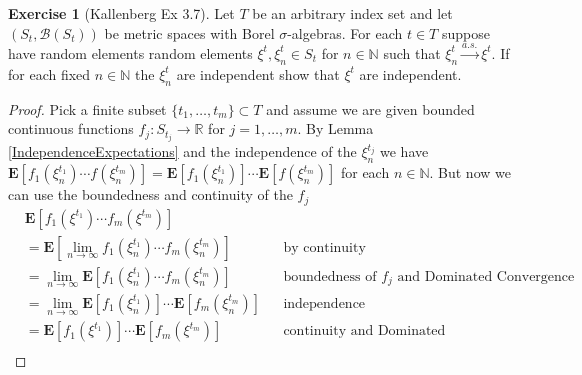 \documentclass{amsbook}
\theoremstyle{definition}
\newtheorem{xca}{Exercise}
\theoremstyle{remark}
\newcommand{\expectation}[1]{\textbf{E}\left[#1\right]}
\newcommand{\reals}{\mathbb{R}}
\newcommand{\naturals}{\mathbb{N}}
\newcommand{\toas}{\overset{a.s.}\to}
\begin{document}
\begin{xca}[Kallenberg Ex 3.7]Let $T$ be an arbitrary index set and let
  $(S_t, \mathcal{B}(S_t))$ be metric spaces with Borel
  $\sigma$-algebras.  For each $t\in T$ suppose have random elements
  random elements $\xi^t, \xi^t_n \in S_t$  for $n \in \naturals$ such
  that $\xi^t_n \toas \xi^t$.  If for each fixed $n \in \naturals$ the
  $\xi^t_n$ are independent show that $\xi^t$ are independent.
\end{xca}
\begin{proof}
Pick a finite subset $\lbrace t_1, \dotsc, t_m \rbrace \subset T$ and
assume we are given bounded continuous functions $f_j : S_{t_j} \to
\reals$ for $j=1, \dotsc, m$.
By Lemma \ref{IndependenceExpectations} and the independence of the
$\xi^{t_j}_n$ we have $\expectation{f_1(\xi^{t_1}_n) \dotsm
  f(\xi^{t_m}_n)} = \expectation{f_1(\xi^{t_1}_n)}\dotsm
 \expectation{ f(\xi^{t_m}_n)}$ for each $n \in \naturals$.  But now
 we can use the boundedness and continuity of the $f_j$ 
\begin{align*}
&\expectation{f_1(\xi^{t_1}) \dotsm f_m(\xi^{t_m})} \\
&=
\expectation{\lim_{n \to \infty} f_1(\xi_n^{t_1}) \dotsm
  f_m(\xi_n^{t_m})} & & \text{by continuity} \\
&= \lim_{n \to \infty} \expectation{f_1(\xi_n^{t_1}) \dotsm
  f_m(\xi_n^{t_m})} & & \text{boundedness of $f_j$ and Dominated
  Convergence}  \\
&= \lim_{n \to \infty} \expectation{f_1(\xi_n^{t_1})} \dotsm
 \expectation{ f_m(\xi_n^{t_m})} & & \text{independence}  \\
&= \expectation{f_1(\xi^{t_1})} \dotsm
 \expectation{ f_m(\xi^{t_m})} & &
 \text{continuity and Dominated Convergence} \\
\end{align*}


\end{proof}
\end{document}
